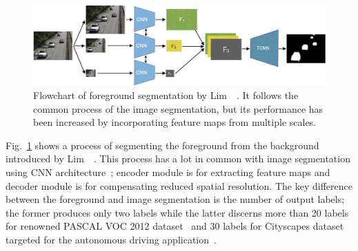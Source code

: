 \documentclass[11pt]{hyu_thesis}
\begin{document}
\begin{figure}
	\centering
	\includegraphics[width=0.8\linewidth]{bg_dcnn.png}
	\caption{Flowchart of foreground segmentation by Lim~\etal~\cite{Lim2018}. It follows the common process of the image segmentation, but its performance has been increased by incorporating feature maps from multiple scales.}
	\label{fig:bg_dcnn}
\end{figure}
Fig.~\ref{fig:bg_dcnn} shows a process of segmenting the foreground from the background introduced by Lim~\etal~\cite{Lim2018}. This process has a lot in common with image segmentation using CNN architecture~\cite{Long2015,chen2014semantic,chen2017rethinking,Zhao2017,chen2018deeplab,chen2018encoder}; encoder module is for extracting feature maps and decoder module is for compensating reduced spatial resolution. The key difference between the foreground and image segmentation is the number of output labels; the former produces only two labels while the latter discerns more than 20 labels for renowned PASCAL VOC 2012 dataset~\cite{Everingham15} and 30 labels for Cityscapes dataset targeted for the autonomous driving application~\cite{Cordts2016Cityscapes}.
\end{document}
